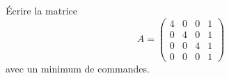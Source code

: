 \begin{exercice}\label{exotestMAT1151-G220001}

	Écrire la matrice
	\[ 
		A=\begin{pmatrix}
			 4	&	0	&	0	&	1	\\
			 0	&	4	&	0	&	1	\\
			 0	&	0	&	4	&	1	\\ 
			 0	&	0	&	0	&	1	 
			  \end{pmatrix}
	\]
	avec un minimum de commandes.

\end{exercice}
